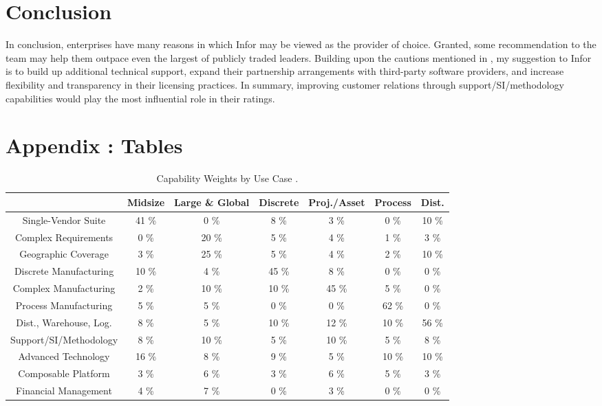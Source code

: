\documentclass{article}
\begin{document}
\section{Conclusion}
In conclusion, enterprises have many reasons in which Infor may be viewed as the provider of choice.
Granted, some recommendation to the team may help them outpace even the largest of publicly traded leaders.
Building upon the cautions mentioned in \cite{magic_cloud_erp}, my suggestion to Infor is to build up additional technical support, expand their partnership arrangements with third-party software providers, and increase flexibility and transparency in their licensing practices.
In summary, improving customer relations through support/SI/methodology capabilities would play the most influential role in their ratings.

\newpage

\section{Appendix : Tables}

\begin{table}[h!]
    \centering
    \begin{tabular}{|c||c|c|c|c|c|c|}
        \hline
        \          & Midsize & Large \& Global & Discrete & Proj./Asset & Process & Dist. \\
        \hline
        \hline
        Single-Vendor Suite     &  41 \%  &  0  \%  &  8  \%  &  3  \%  &  0  \%  &  10 \% \\
        \hline
        Complex Requirements    &  0  \%  &  20 \%  &  5  \%  &  4  \%  &  1  \%  &  3  \% \\
        \hline
        Geographic Coverage     &  3  \%  &  25 \%  &  5  \%  &  4  \%  &  2  \%  &  10 \% \\
        \hline
        Discrete Manufacturing  &  10 \%  &  4  \%  &  45 \%  &  8  \%  &  0  \%  &  0  \% \\
        \hline
        Complex Manufacturing   &  2  \%  &  10 \%  &  10 \%  &  45 \%  &  5  \%  &  0  \% \\
        \hline
        Process Manufacturing   &  5  \%  &  5  \%  &  0  \%  &  0  \%  &  62 \%  &  0  \% \\
        \hline
        Dist., Warehouse, Log.  &  8  \%  &  5  \%  &  10 \%  &  12 \%  &  10 \%  &  56 \% \\
        \hline
        Support/SI/Methodology  &  8  \%  &  10 \%  &  5  \%  &  10 \%  &  5  \%  &  8  \% \\
        \hline
        Advanced Technology     &  16 \%  &  8  \%  &  9  \%  &  5  \%  &  10 \%  &  10 \% \\
        \hline
        Composable Platform     &  3  \%  &  6  \%  &  3  \%  &  6  \%  &  5  \%  &  3  \% \\
        \hline
        Financial Management    &  4  \%  &  7  \%  &  0  \%  &  3  \%  &  0  \%  &  0  \% \\
        \hline
    \end{tabular}
    \caption{Capability Weights by Use Case \cite{critical_cloud_erp}.}
    \label{tab:cap_by_use}
\end{table}
\end{document}
